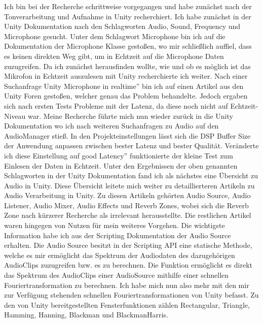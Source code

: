 Ich bin bei der Recherche schrittweise vorgegangen und habe zunächst nach der Tonverarbeitung und Aufnahme in Unity recherchiert. Ich habe zunächst in der Unity Dokumentation nach den Schlagworten Audio, Sound, Frequency und Microphone gesucht. Unter dem Schlagwort Microphone bin ich auf die Dokumentation der Microphone Klasse gestoßen, wo mir schließlich auffiel, dass es keinen direkten Weg gibt, um in Echtzeit auf die Microphone Daten zuzugreifen. \cite{unity_doku_micro} Da ich zunächst herausfinden wollte, wie und ob es möglich ist das Mikrofon in Echtzeit auszulesen mit Unity recherchierte ich weiter. Nach einer Suchanfrage \glqq Unity Microphone in realtime'' bin ich auf einen Artikel aus den Unity Foren gestoßen, welcher genau das Problem behandelte. \cite{unity_forum_realtime} Jedoch ergaben sich nach ersten Tests Probleme mit der Latenz, da diese noch nicht auf Echtzeit-Niveau war. Meine Recherche führte mich nun wieder zurück in die Unity Dokumentation wo ich nach weiteren Suchanfragen zu Audio auf den AudioManager stieß. In den Projekteinstellungen lässt sich die DSP Buffer Size der Anwendung anpassen zwischen bester Latenz und bester Qualität. \cite{unity_doku_audioManager} Veränderte ich diese Einstellung auf \glqq good Latency'' funktionierte der kleine Test zum Einlesen der Daten in Echtzeit. Unter den Ergebnissen der oben genannten Schlagworten in der Unity Dokumentation fand ich als nächstes eine Übersicht zu Audio in Unity. \cite{unity_doku_audio} Diese Übersicht leitete mich weiter zu detaillierteren Artikeln zu Audio Verarbeitung in Unity. Zu diesen Artikeln gehörten Audio Source, Audio Listener, Audio Mixer, Audio Effects und Reverb Zones, wobei sich die Reverb Zone nach kürzerer Recherche als irrelevant herausstellte. Die restlichen Artikel waren hingegen von Nutzen für mein weiteres Vorgehen. Die wichtigste Information habe ich aus der Scripting Dokumentation der Audio Source erhalten. Die Audio Source besitzt in der Scripting API eine statische Methode, welche es mir ermöglicht das Spektrum der Audiodaten des dazugehörigen AudioClips zuzugreifen bzw. es zu berechnen. \cite{unity_doku_spectrumData}
Die Funktion ermöglicht es direkt das Spektrum des AudioClips einer AudioSource mithilfe einer schnellen Fouriertransformation zu berechnen. Ich habe mich nun also mehr mit den mir zur Verfügung stehenden schnellen Fouriertransformationen von Unity befasst. Zu den von Unity bereitgestellten Fensterfunktionen zählen Rectangular, Triangle, Hamming, Hanning, Blackman und BlackmanHarris. 
\\ %
